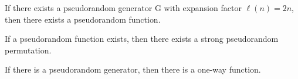 \documentclass[../main]{subfiles}
\begin{document}
\begin{theorem}
    If there exists a pseudorandom generator G with expansion factor $\ell(n)=2n$, then there exists a pseudorandom function.
\end{theorem}

\begin{theorem}
    If a pseudorandom function exists, then there exists a strong pseudorandom permutation.
\end{theorem}

\begin{theorem}
    If there is a pseudorandom generator, then there is a one-way function.
\end{theorem}
\end{document}
